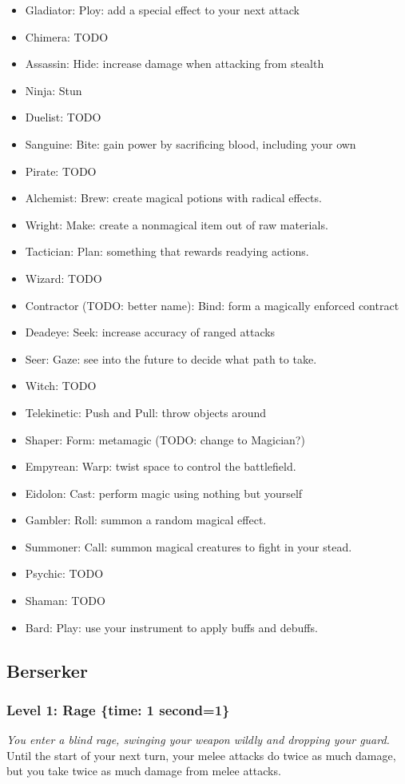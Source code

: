 \documentclass[12pt]{article}
\newcommand{\TIME}[1]{\{time: #1 second\if1=#1{}\else{s}\fi\}}
\newcommand{\Class}[1]{\pagebreak\subsection{#1}\label{#1}}
\newcommand{\Skill}[5]{\subsubsection{Level #1: #2 #3}\textit{#4}\\[1mm]#5}
\begin{document}
\begin{itemize}
\item Gladiator: Ploy: add a special effect to your next attack
\item Chimera: TODO
\item Assassin: Hide: increase damage when attacking from stealth
\item Ninja: Stun
\item Duelist: TODO
\item Sanguine: Bite: gain power by sacrificing blood, including your own
\item Pirate: TODO
\item Alchemist: Brew: create magical potions with radical effects.
\item Wright: Make: create a nonmagical item out of raw materials.
\item Tactician: Plan: something that rewards readying actions.
\item Wizard: TODO
\item Contractor (TODO: better name): Bind: form a magically enforced contract
\item Deadeye: Seek: increase accuracy of ranged attacks
\item Seer: Gaze: see into the future to decide what path to take.
\item Witch: TODO
\item Telekinetic: Push and Pull: throw objects around
\item Shaper: Form: metamagic (TODO: change to Magician?)
\item Empyrean: Warp: twist space to control the battlefield.
\item Eidolon: Cast: perform magic using nothing but yourself
\item Gambler: Roll: summon a random magical effect.
\item Summoner: Call: summon magical creatures to fight in your stead.
\item Psychic: TODO
\item Shaman: TODO
\item Bard: Play: use your instrument to apply buffs and debuffs.
\end{itemize}

\Class{Berserker}

\Skill{1}{Rage}{\TIME{1}}
{You enter a blind rage, swinging your weapon wildly and dropping your guard.}
{Until the start of your next turn, your melee attacks do twice as much damage, but you take twice as much damage from melee attacks.}
\end{document}
